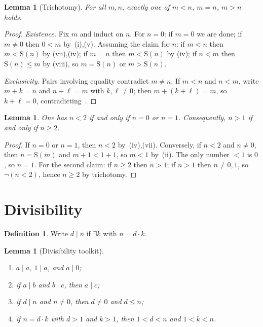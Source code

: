 \documentclass[11pt,reqno]{amsart}
\theoremstyle{plain}
\newtheorem{lemma}[theorem]{Lemma}
\theoremstyle{definition}
\newtheorem{definition}[theorem]{Definition}
\theoremstyle{remark}
\newcommand{\Suc}{\mathrm{S}}
\numberwithin{equation}{section}
\begin{document}
\begin{lemma}[Trichotomy]
\label{lem:trichotomy}
For all \(m,n\), exactly one of \(m<n\), \(m=n\), \(m>n\) holds.
\end{lemma}

\begin{proof}
\textit{Existence.}
Fix \(m\) and induct on \(n\). For \(n=0\): if \(m=0\) we are done;
if \(m\neq 0\) then \(0<m\) by~(i),(v). Assuming the
claim for \(n\): if \(m<n\) then \(m<\Suc(n)\) by
(vii),(iv); if \(m=n\) then \(m<\Suc(n)\) by
(iv); if \(n<m\) then \(\Suc(n)\le m\) by
(viii), so \(m=\Suc(n)\) or \(m>\Suc(n)\).

\textit{Exclusivity.}
Pairs involving equality contradict \(m\neq n\). If \(m<n\) and
\(n<m\), write \(m+k=n\) and \(n+\ell=m\) with \(k,\ell\neq 0\); then
\(m+(k+\ell)=m\), so \(k+\ell=0\), contradicting~.
\end{proof}

\begin{lemma}
\label{lem:lt-two}
One has \(n<2\) if and only if \(n=0\) or \(n=1\). Consequently,
\(n>1\) if and only if \(n\ge 2\).
\end{lemma}

\begin{proof}
If \(n=0\) or \(n=1\), then \(n<2\) by~(iv),(vii).
Conversely, if \(n<2\) and \(n\neq 0\), then \(n=\Suc(m)\) and
\(m+1<1+1\), so \(m<1\) by~(ii). The only number
\(<1\) is \(0\), so \(n=1\). For the second claim: if \(n\ge 2\) then
\(n>1\); if \(n>1\) then \(n\neq 0,1\), so \(\neg(n<2)\), hence
\(n\ge 2\) by trichotomy.
\end{proof}

\section{Divisibility}
\label{sec:div}

\begin{definition}
\label{def:dvd}
Write \(d\mid n\) if \(\exists k\) with \(n=d\cdot k\).
\end{definition}

\begin{lemma}[Divisibility toolkit]
\label{lem:dvd}
\begin{enumerate}[label=(\roman*)]
  \item \(a\mid a\), \(1\mid a\), and \(a\mid 0\);
  \item if \(a\mid b\) and \(b\mid c\), then \(a\mid c\);
  \item if \(d\mid n\) and \(n\neq 0\), then \(d\neq 0\) and \(d\le n\);
  \item if \(n=d\cdot k\) with \(d>1\) and \(k>1\), then
        \(1<d<n\) and \(1<k<n\).
\end{enumerate}
\end{lemma}
\end{document}
